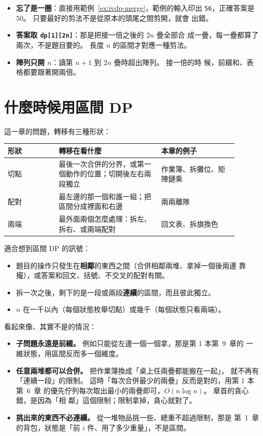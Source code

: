 \begin{itemize}
\item \textbf{忘了是一圈}：直接用範例~\ref{ex:ivdp-merge}，範例的輸入印出
\texttt{56}，正確答案是 $50$。 只要最好的剪法不是從原本的頭尾之間剪開，就會
出錯。
\item \textbf{答案取 \texttt{dp[1][2n]}}：那是把接一倍之後的 $2n$ 疊全部合
成一疊，每一疊都算了兩次，不是題目要的。 長度 $n$ 的區間才對應一種剪法。
\item \textbf{陣列只開 $n$}：讀第 $n + 1$ 到 $2n$ 疊時超出陣列。 接一倍的時
候，前綴和、表格都要跟著開兩倍。
\end{itemize}

\section{什麼時候用區間 DP}
\label{sec:ivdp-when}

這一章的問題，轉移有三種形狀：

\begin{center}
\begin{tabular}{p{0.2\linewidth}p{0.4\linewidth}p{0.3\linewidth}}
\toprule
形狀 & 轉移在看什麼 & 本章的例子 \\
\midrule
切點 & 最後一次合併的分界，或第一個動作的位置；切開後左右兩段獨立 & 作業簿、拆攤位、矩陣鏈乘 \\
配對 & 最左邊的那一個和誰一組；把區間分成裡面和右邊 & 兩兩離隊 \\
兩端 & 最外面兩個怎麼處理：拆左、拆右、或兩端配對 & 回文表、拆旗換色 \\
\bottomrule
\end{tabular}
\end{center}

適合想到區間 DP 的訊號：

\begin{itemize}
\item 題目的操作只發生在\textbf{相鄰}的東西之間（合併相鄰兩堆、拿掉一個後兩邊
靠攏），或答案和回文、括號、不交叉的配對有關。
\item 拆一次之後，剩下的是一段或兩段\textbf{連續}的區間，而且彼此獨立。
\item $n$ 在一千以內（每個狀態枚舉切點）或幾千（每個狀態只看兩端）。
\end{itemize}

看起來像、其實不是的情況：

\begin{itemize}
\item \textbf{子問題永遠是前綴。} 例如只能從左邊一個一個拿，那是第 1 本第~9~章的
一維狀態，用區間反而多一個維度。
\item \textbf{任意兩堆都可以合併。} 把作業簿換成「桌上任兩疊都能搬在一起」，
就不再有「連續一段」的限制。 這時「每次合併最少的兩疊」反而是對的，用第 1 本第~6~章
的優先佇列每次取出最小的兩疊即可，$O(n \log n)$。 章首的貪心錯，是因為「相
鄰」這個限制；限制拿掉，貪心就對了。
\item \textbf{挑出來的東西不必連續。} 從一堆物品挑一些、總重不超過限制，那是
第~1~章的背包，狀態是「前 $i$ 件、用了多少重量」，不是區間。
\end{itemize}

